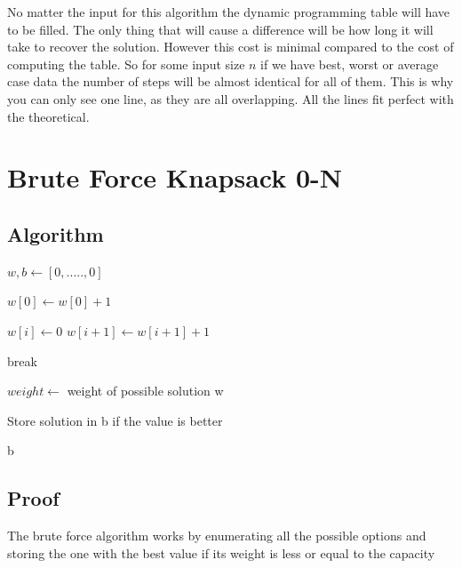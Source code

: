 \documentclass{article}
\begin{document}
			\break
			
			No matter the input for this algorithm the dynamic programming table will have to be filled. The only thing that will cause a difference will be how long it will take to recover the solution. However this cost is minimal compared to the cost of computing the table. So for some input size $n$ if we have best, worst or average case data the number of steps will be almost identical for all of them. This is why you can only see one line, as they are all overlapping. All the lines fit perfect with the theoretical.
		
			\break			
		
	\section{Brute Force Knapsack 0-N}
		\subsection{Algorithm}
			\begin{algorithm}
				\begin{algorithmic}[1]
						\State $w, b \gets [0,.....,0]$ 

							\State $w[0] \gets w[0] + 1$
							
							 
									\State $w[i] \gets 0$
									\State $w[i+1] \gets w[i+1] + 1$
								\EndIf
							\EndFor
							
							 
								\State break
							\EndIf
							
							\State $weight \gets$ weight of possible solution w
							
								\State Store solution in b if the value is better
							\EndIf
						\EndWhile
						
						\Return b
					\EndProcedure				
					
				\end{algorithmic}
			\end{algorithm}		
		\subsection{Proof}		
			The brute force algorithm works by enumerating all the possible options and storing the one with the best value if its weight is less or equal to the capacity
\end{document}
